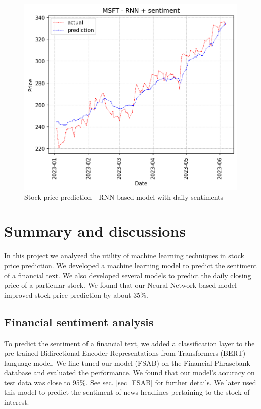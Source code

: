 \documentclass[11pt]{article}
\begin{document}
\begin{figure}[h]
	\centering
	\includegraphics[width = .75\linewidth]{graphics/sentimentrnn.png}
	\caption{Stock price prediction - RNN based model with daily sentiments}
	\label{fig_sentimentrnn}
\end{figure}

\section{Summary and discussions}
In this project we analyzed the utility of machine learning techniques in stock price prediction. We developed a machine learning model to predict the sentiment of a financial text. We also developed several models to predict the daily closing price of a particular stock. We found that our Neural Network based model improved stock price prediction by about 35\%. 
\subsection{Financial sentiment analysis}
To predict the sentiment of a financial text, we added a classification layer to the pre-trained Bidirectional Encoder Representations from Transformers (BERT) language model. We fine-tuned our model (FSAB) on the Financial Phrasebank database and evaluated the performance. We found that our model's accuracy on test data was close to 95\%. See sec. \ref{sec_FSAB} for further details. We later used this model to predict the sentiment of news headlines pertaining to the stock of interest.
\end{document}
